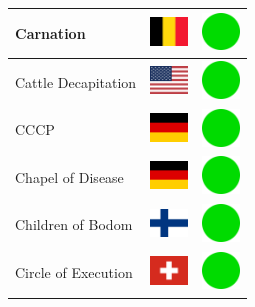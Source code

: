 \documentclass[12pt, a4paper, twoside]{report}
\begin{document}
\begin{center}
\begin{longtable}{|p{5cm}|p{2cm}|p{2cm}|}
Carnation & \includegraphics[width=1cm]{4x3/be} & \includegraphics[width=1cm]{likes/y} \\ \hline
Cattle Decapitation & \includegraphics[width=1cm]{4x3/us} & \includegraphics[width=1cm]{likes/y} \\ \hline
CCCP & \includegraphics[width=1cm]{4x3/de} & \includegraphics[width=1cm]{likes/y} \\ \hline
Chapel of Disease & \includegraphics[width=1cm]{4x3/de} & \includegraphics[width=1cm]{likes/y} \\ \hline
Children of Bodom & \includegraphics[width=1cm]{4x3/fi} & \includegraphics[width=1cm]{likes/y} \\ \hline
Circle of Execution & \includegraphics[width=1cm]{4x3/ch} & \includegraphics[width=1cm]{likes/y} \\ \hline

\end{longtable}
\end{center}
\end{document}

